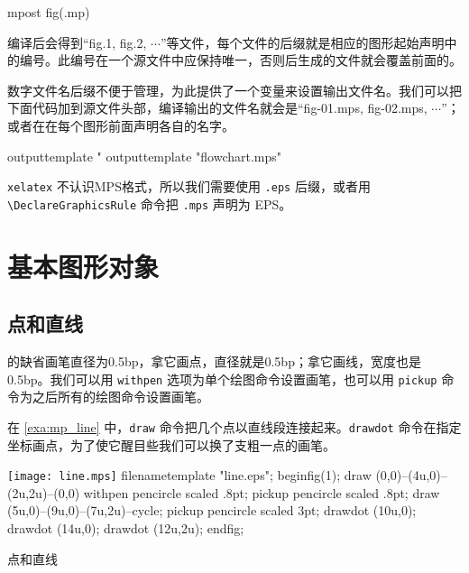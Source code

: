 \begin{Code}[]
mpost fig(.mp)
\end{Code}

编译后会得到“fig.1, fig.2, $\cdots$”等文件，每个文件的后缀就是相应的图形起始声明中的编号。此编号在一个源文件中应保持唯一，否则后生成的文件就会覆盖前面的。

数字文件名后缀不便于管理，\MP 为此提供了一个变量来设置输出文件名。我们可以把下面代码加到源文件头部，编译输出的文件名就会是“fig-01.mps, fig-02.mps, $\cdots$”；或者在在每个图形前面声明各自的名字。

\begin{Code}[]
outputtemplate "%
outputtemplate "flowchart.mps" %
\end{Code}

\texttt{xelatex} 不认识MPS格式，所以我们需要使用 \texttt{.eps} 后缀，或者用 \verb|\DeclareGraphicsRule| 命令把 \texttt{.mps} 声明为 EPS。

\begin{Code}[]
\end{Code}

\section{基本图形对象}

\subsection{点和直线}

\MP 的缺省画笔直径为0.5bp，拿它画点，直径就是0.5bp；拿它画线，宽度也是0.5bp。我们可以用 \texttt{withpen} 选项为单个绘图命令设置画笔，也可以用 \texttt{pickup} 命令为之后所有的绘图命令设置画笔。

在 \autoref{exa:mp_line} 中，\texttt{draw} 命令把几个点以直线段连接起来。\texttt{drawdot} 命令在指定坐标画点，为了使它醒目些我们可以换了支粗一点的画笔。

\begin{example}[htbp]
\begin{FBTDemo}[numbers=left]{\texttt{[image: line.mps]}}
filenametemplate "line.eps";
beginfig(1);
draw (0,0)--(4u,0)--(2u,2u)--(0,0) 
  withpen pencircle scaled .8pt;
pickup pencircle scaled .8pt;
draw (5u,0)--(9u,0)--(7u,2u)--cycle;
pickup pencircle scaled 3pt;
drawdot (10u,0);
drawdot (14u,0);
drawdot (12u,2u);
endfig;
\end{FBTDemo}
\caption{\MP 点和直线}
\label{exa:mp_line}
\end{example}

